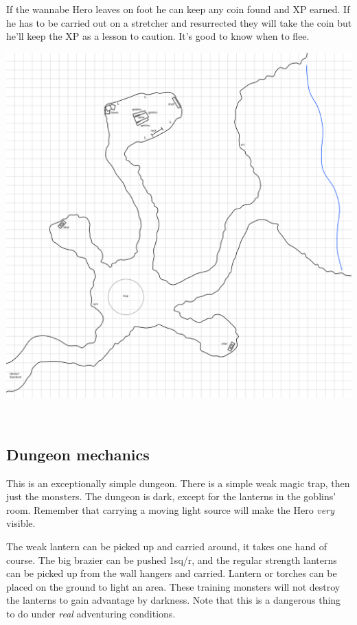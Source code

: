 \noindent
If the wannabe Hero leaves on foot he can keep any coin found and XP earned. If he has to be carried out on a stretcher and resurrected they will take the coin but he'll keep the XP as a lesson to caution. It's good to know when to flee.




\clearpage %

\noindent
%
\includegraphics[width=0.999\textwidth]{./map/cave.png}

\


\subsection*{Dungeon mechanics}

This is an exceptionally simple dungeon. There is a simple weak magic trap, then just the monsters. The dungeon is dark, except for the lanterns in the goblins' room. Remember that carrying a moving light source will make the Hero \emph{very} visible.

The weak lantern can be picked up and carried around, it takes one hand of course. The big brazier can be pushed 1sq/r, and the regular strength lanterns can be picked up from the wall hangers and carried. Lantern or torches can be placed on the ground to light an area. These training monsters will not destroy the lanterns to gain advantage by darkness. Note that this is a dangerous thing to do under \emph{real} adventuring conditions.

